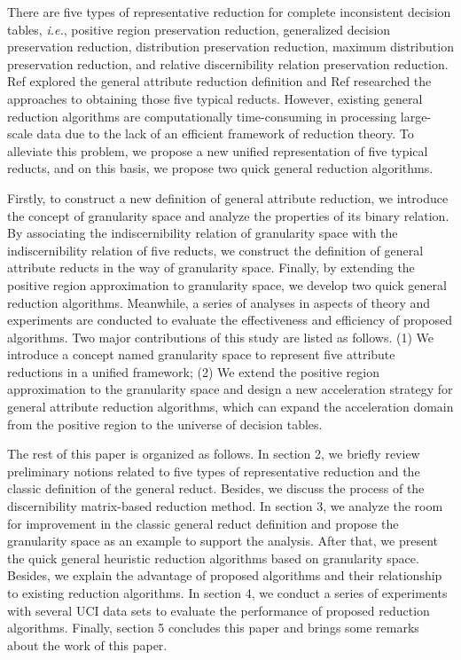 \documentclass[review]{elsarticle}
\begin{document}
	\par There are five types of representative reduction for complete inconsistent decision tables, \emph{i.e.}, positive region preservation reduction, generalized decision preservation reduction, distribution preservation reduction, maximum distribution preservation reduction, and relative discernibility relation preservation reduction. Ref \cite{jia2016generalized} explored the general attribute reduction definition and Ref \cite{ge2017quick} researched the approaches to obtaining those five typical reducts. However, existing general reduction algorithms are computationally time-consuming in processing large-scale data due to the lack of an efficient framework of reduction theory. To alleviate this problem, we propose a new unified representation of five typical reducts, and on this basis, we propose two quick general reduction algorithms.
	\par Firstly, to construct a new definition of general attribute reduction, we introduce the concept of granularity space and analyze the properties of its binary relation. By associating the indiscernibility relation of granularity space with the indiscernibility relation of five reducts, we construct the definition of general attribute reducts in the way of granularity space. Finally, by extending the positive region approximation to granularity space, we develop two quick general reduction algorithms. Meanwhile, a series of analyses in aspects of theory and experiments are conducted to evaluate the effectiveness and efficiency of proposed algorithms.
	Two major contributions of this study are listed as follows. (1) We introduce a concept named granularity space to represent five attribute reductions in a unified framework; (2) We extend the positive region approximation to the granularity space and design a new acceleration strategy for general attribute reduction algorithms, which can expand the acceleration domain from the positive region to the universe of decision tables.
	
	\par The rest of this paper is organized as follows. In section 2, we briefly review preliminary notions related to five types of representative reduction and the classic definition of the general reduct. Besides, we discuss the process of the discernibility matrix-based reduction method. In section 3, we analyze the room for improvement in the classic general reduct definition and propose the granularity space as an example to support the analysis. After that, we present the quick general heuristic reduction algorithms based on granularity space. Besides, we explain the advantage of proposed algorithms and their relationship to existing reduction algorithms. In section 4, we conduct a series of experiments with several UCI data sets to evaluate the performance of proposed reduction algorithms. Finally, section 5 concludes this paper and brings some remarks about the work of this paper.
	
\end{document}
